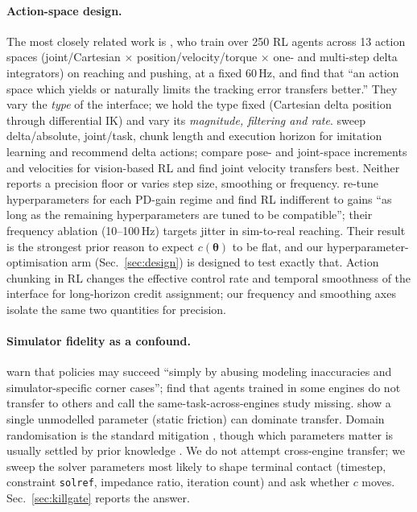 \documentclass{article}
\newcommand{\iface}{\boldsymbol{\theta}}
\begin{document}
\paragraph{Action-space design.}
The most closely related work is \citet{aljalbout2024role}, who train over 250
RL agents across 13 action spaces (joint/Cartesian $\times$
position/velocity/torque $\times$ one- and multi-step delta integrators) on
reaching and pushing, at a fixed 60\,Hz, and find that ``an action space which
yields or naturally limits the tracking error transfers better.'' They vary the
\emph{type} of the interface; we hold the type fixed (Cartesian delta position
through differential IK) and vary its \emph{magnitude, filtering and rate}.
\citet{feng2026demystifying} sweep delta/absolute, joint/task, chunk length and
execution horizon for imitation learning and recommend delta actions;
\citet{azimi2026benchmarking} compare pose- and joint-space increments and
velocities for vision-based RL and find joint velocity transfers best. Neither
reports a precision floor or varies step size, smoothing or frequency.
\citet{bronars2026tune} re-tune hyperparameters for each PD-gain regime and find
RL indifferent to gains ``as long as the remaining hyperparameters are tuned to
be compatible''; their frequency ablation (10--100\,Hz) targets jitter in
sim-to-real reaching. Their result is the strongest prior reason to expect
$c(\iface)$ to be flat, and our hyperparameter-optimisation arm
(Sec.~\ref{sec:design}) is designed to test exactly that. Action chunking in RL
\citep{li2025chunking,chen2026acsac} changes the effective control rate and
temporal smoothness of the interface for long-horizon credit assignment; our
frequency and smoothing axes isolate the same two quantities for precision.

\paragraph{Simulator fidelity as a confound.}
\citet{aljalbout2025reality} warn that policies may succeed ``simply by abusing
modeling inaccuracies and simulator-specific corner cases'';
\citet{kaup2024review} find that agents trained in some engines do not transfer
to others and call the same-task-across-engines study missing.
\citet{hu2025static} show a single unmodelled parameter (static friction) can
dominate transfer. Domain randomisation is the standard mitigation
\citep{muratore2022review}, though which parameters matter is usually settled by
prior knowledge \citep{kaidanov2024role}. We do not attempt cross-engine
transfer; we sweep the solver parameters most likely to shape terminal contact
(timestep, constraint \texttt{solref}, impedance ratio, iteration count) and ask
whether $c$ moves. Sec.~\ref{sec:killgate} reports the answer.
\end{document}

